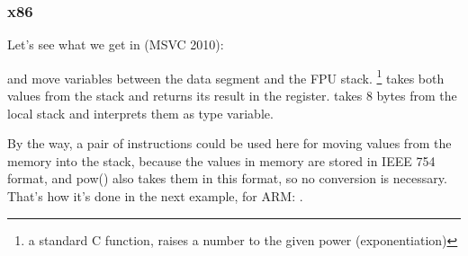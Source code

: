 ﻿\subsubsection{x86}

Let's see what we get in (MSVC 2010):




\FLD and \FSTP move variables between the data segment and the FPU stack. 
\footnote{a standard C function, raises a number to the given power (exponentiation)}
takes both values from the stack and returns its result in the  register.
\printf takes 8 bytes from the local stack and interprets them as \Tdouble type variable.

By the way, a pair of \MOV instructions could be used here for moving values from the memory
into the stack, because the values in memory are stored in IEEE 754 format, and pow() also takes them in this
format, so no conversion is necessary.
That's how it's done in the next example, for ARM: .

